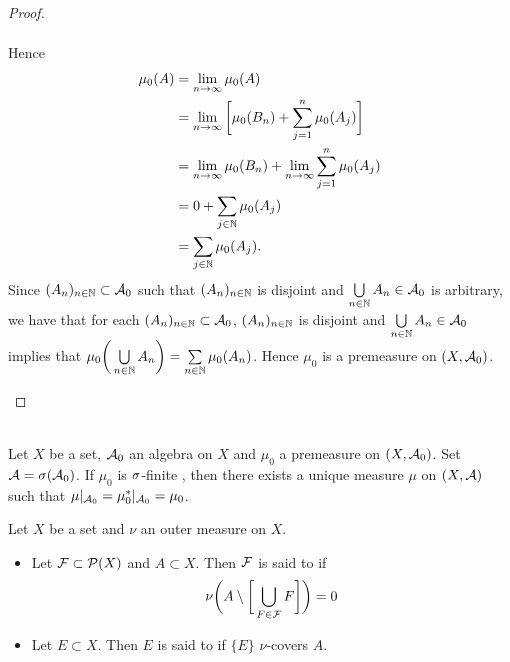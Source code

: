 \documentclass{book}
\begin{document}
\begin{proof}
\begin{enumerate}
\begin{align*}
			\end{align*}
			Hence 
			\begin{align*}
				\mu_0(A)
				& = \lim_{n \rightarrow \infty} \mu_0(A) \\
				& = \lim_{n \rightarrow \infty} \bigg[ \mu_0(B_n) + \sum\limits_{j=1}^n \mu_0(A_j) \bigg] \\
				& = \lim_{n \rightarrow \infty} \mu_0(B_n) + \lim_{n \rightarrow \infty} \sum\limits_{j=1}^n \mu_0(A_j) \\
				& = 0 + \sum_{j \in \mathbb{N}} \mu_0(A_j) \\
				& = \sum_{j \in \mathbb{N}} \mu_0(A_j).
			\end{align*}  
			Since $(A_n)_{n \in \mathbb{N}} \subset \mathcal{A}_0$ such that $(A_n)_{n \in \mathbb{N}}$ is disjoint and $\bigcup\limits_{n \in \mathbb{N}} A_n \in \mathcal{A}_0$ is arbitrary, we have that for each $(A_n)_{n \in \mathbb{N}} \subset \mathcal{A}_0$, $(A_n)_{n \in \mathbb{N}}$ is disjoint and $\bigcup\limits_{n \in \mathbb{N}} A_n \in \mathcal{A}_0$ implies that $\mu_0 \bigg(\bigcup\limits_{n\in \mathbb{N}}A_n \bigg) = \sum\limits_{n \in \mathbb{N}}\mu_0(A_n)$. Hence $\mu_0$ is a premeasure on $(X, \mathcal{A}_0)$.
		\end{enumerate}
	\end{proof}
	
	\begin{thm}   \\
		Let $X$ be a set, $\mathcal{A}_0$ an algebra on $X$ and $\mu_0$ a premeasure on $(X,\mathcal{A}_0)$. Set $\mathcal{A} = \sigma(\mathcal{A}_0)$. If $\mu_0$ is $\sigma$-finite , then there exists a unique measure $\mu$ on $(X, \mathcal{A})$ such that $\mu|_{\mathcal{A}_0} = \mu_0^*|_{\mathcal{A}_0} = \mu_0$. 
	\end{thm}

	
	
	
	
	
	\begin{defn}  
		Let $X$ be a set and $\nu$ an outer measure on $X$. 
		\begin{itemize}
			\item Let $\mathcal{F} \subset \mathcal{P}(X)$ and $A \subset X$. Then $\mathcal{F}$ is said to  if 
			$$\nu \bigg(A \setminus \bigg[ \bigcup_{F \in \mathcal{F}} F \bigg] \bigg) = 0$$
			\item Let $E \subset X$. Then $E$ is said to  if $\{E\}$ $\nu$-covers $A$.
		\end{itemize}
	\end{defn}
	
\end{document}
